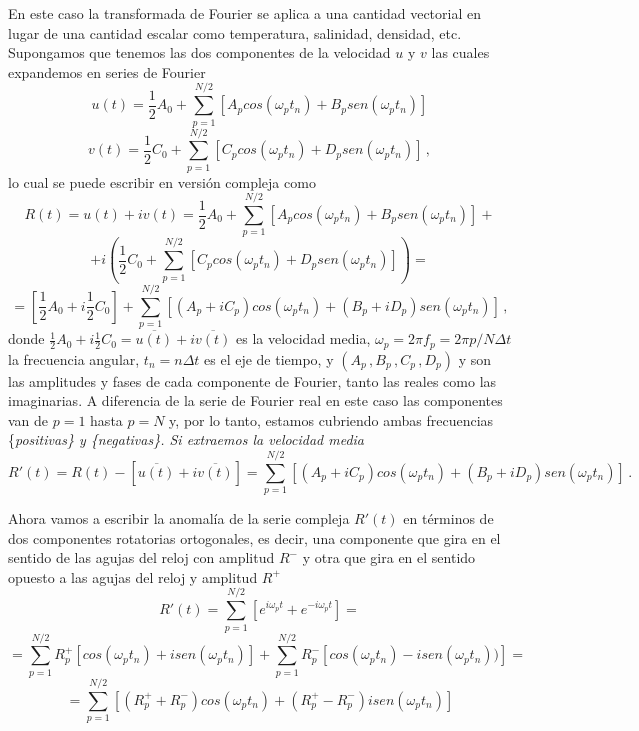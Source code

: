 \documentclass[
]{agujournal2019}
\begin{document}
En este caso la transformada de Fourier se aplica a una cantidad
vectorial en lugar de una cantidad escalar como temperatura, salinidad,
densidad, etc. Supongamos que tenemos las dos componentes de la
velocidad \(u\) y \(v\) las cuales expandemos en series de Fourier
\[u(t)=\frac{1}{2}A_0+\sum\limits^{N/2}_{p=1}[A_p cos(\omega_p t_n) + B_p sen(\omega_p t_n)]\]
\[v(t)=\frac{1}{2}C_0+\sum\limits^{N/2}_{p=1}[C_p cos(\omega_p t_n) + D_p sen(\omega_p t_n)]\,,\]
lo cual se puede escribir en versión compleja como
\[R(t)=u(t)+i v(t)=\frac{1}{2}A_0+\sum\limits^{N/2}_{p=1}[A_p cos(\omega_p t_n) + B_p sen(\omega_p t_n)]
+\]
\[+ i \left(\frac{1}{2}C_0+\sum\limits^{N/2}_{p=1}[C_p cos(\omega_p t_n) + D_p sen(\omega_p t_n)]\right)=\]
\[=\left[\frac{1}{2}A_0 + i \frac{1}{2}C_0\right] + \sum\limits^{N/2}_{p=1} \left[ (A_p + iC_p) cos(\omega_p t_n) + (B_p + i D_p) sen(\omega_p t_n) \right]\,,\]
donde
\(\frac{1}{2}A_0 + i \frac{1}{2}C_0=\overline{u(t)} +i \overline{v(t)}\)
es la velocidad media, \(\omega_p=2\pi f_p=2\pi p/N\Delta t\) la
frecuencia angular, \(t_n=n\Delta t\) es el eje de tiempo, y
\((A_p\,,B_p\,,C_p\,,D_p)\) y son las amplitudes y fases de cada
componente de Fourier, tanto las reales como las imaginarias. A
diferencia de la serie de Fourier real en este caso las componentes van
de \(p=1\) hasta \(p=N\) y, por lo tanto, estamos cubriendo ambas
frecuencias \{\it positivas\} y \{\it negativas\}. Si extraemos la
velocidad media
\[R'(t)=R(t)-[\overline{u(t)} +i \overline{v(t)}]=\sum\limits^{N/2}_{p=1} \left[ (A_p + iC_p) cos(\omega_p t_n) + (B_p + i D_p) sen(\omega_p t_n) \right]\,.\]

Ahora vamos a escribir la anomalía de la serie compleja \(R'(t)\) en
términos de dos componentes rotatorias ortogonales, es decir, una
componente que gira en el sentido de las agujas del reloj con amplitud
\(R^{-}\) y otra que gira en el sentido opuesto a las agujas del reloj y
amplitud \(R^{+}\)
\[R'(t)=\sum\limits^{N/2}_{p=1} \left[ e^{i\omega_p t} + e^{-i\omega_p t}\right]=\]
\[    =\sum\limits^{N/2}_{p=1}  R_p^{+}\left[cos\left(\omega_p t_n\right) + i sen\left(\omega_p t_n\right )\right] +
       \sum\limits^{N/2}_{p=1}  R_p^{-}\left[cos\left(\omega_p t_n\right) - i sen\left(\omega_p t_n\right))\right]=\]
\[=\sum\limits^{N/2}_{p=1}\left[ (R_p^+ + R_p^{-})cos\left(\omega_p t_n\right) + (R_p^+ - R_p^{-})i sen\left(\omega_p t_n\right) \right]\]
\end{document}
